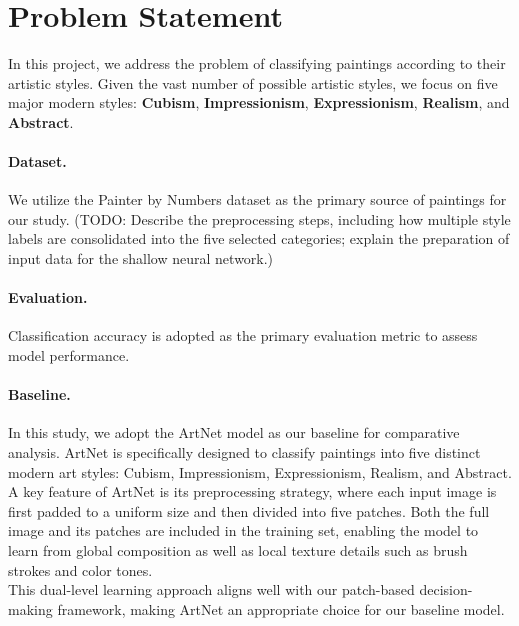 \section{Problem Statement} \label{sec:statement}
In this project, we address the problem of classifying paintings according to their artistic styles. Given the vast number of possible artistic styles, we focus on five major modern styles: \textbf{Cubism}, \textbf{Impressionism}, \textbf{Expressionism}, \textbf{Realism}, and \textbf{Abstract}.
\paragraph{Dataset.}
We utilize the Painter by Numbers dataset \cite{painter_by_numbers} as the primary source of paintings for our study.
(TODO: Describe the preprocessing steps, including how multiple style labels are consolidated into the five selected categories; explain the preparation of input data for the shallow neural network.)
\paragraph{Evaluation.}
Classification accuracy is adopted as the primary evaluation metric to assess model performance.
\paragraph{Baseline.}
In this study, we adopt the ArtNet model \cite{artnet} as our baseline for comparative analysis. ArtNet is specifically designed to classify paintings into five distinct modern art styles: Cubism, Impressionism, Expressionism, Realism, and Abstract. 
A key feature of ArtNet is its preprocessing strategy, where each input image is first padded to a uniform size and then divided into five patches. Both the full image and its patches are included in the training set, enabling the model to learn from global composition as well as local texture details such as brush strokes and color tones. \\
This dual-level learning approach aligns well with our patch-based decision-making framework, making ArtNet an appropriate choice for our baseline model.
